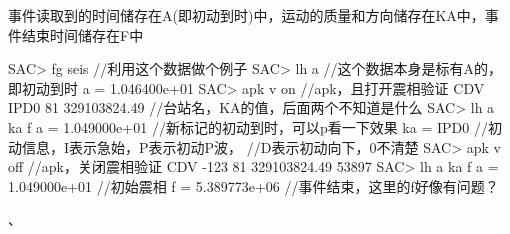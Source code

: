 事件读取到的时间储存在A(即初动到时)中，运动的质量和方向储存在KA中，事件结束时间储存在F中

\begin{SACCode}
SAC> fg seis                //利用这个数据做个例子
SAC> lh a                   //这个数据本身是标有A的，即初动到时
     a = 1.046400e+01
SAC> apk v on               //apk，且打开震相验证
 CDV IPD0 81 329103824.49   //台站名，KA的值，后面两个不知道是什么
SAC> lh a ka f
      a = 1.049000e+01      //新标记的初动到时，可以p看一下效果
     ka = IPD0              //初动信息，I表示急始，P表示初动P波，
                            //D表示初动向下，0不清楚
SAC> apk v off              //apk，关闭震相验证
 CDV -123 81 329103824.49   53897
SAC> lh a ka f
     a = 1.049000e+01       //初始震相
     f = 5.389773e+06       //事件结束，这里的f好像有问题？
\end{SACCode}

、
